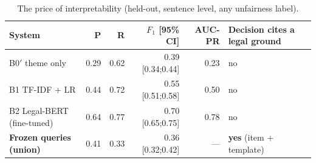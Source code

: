 \begin{table}[t]
\caption{The price of interpretability (held-out, sentence level, any unfairness label).}
\label{tab:cost}
\centering
\footnotesize\setlength{\tabcolsep}{4pt}
\begin{tabular}{@{}lrrrrl@{}}
\toprule
System & P & R & $F_1$ [95\% CI] & AUC-PR & Decision cites a legal ground \\
\midrule
B0$'$ theme only & 0.29 & 0.62 & 0.39 [0.34;0.44] & 0.23 & no \\
B1 TF-IDF + LR & 0.44 & 0.72 & 0.55 [0.51;0.58] & 0.50 & no \\
B2 Legal-BERT (fine-tuned) & 0.64 & 0.77 & 0.70 [0.65;0.75] & 0.78 & no \\
\textbf{Frozen queries (union)} & 0.41 & 0.33 & 0.36 [0.32;0.42] & --- & \textbf{yes} (item + template) \\
\bottomrule
\end{tabular}
\end{table}
